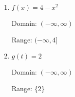 \documentclass{ximera}
\begin{document}
\begin{enumerate}



\item 


$f(x) = 4-x^2$

Domain: $(-\infty, \infty)$ 

Range:  $(-\infty, 4]$

 

 





\item   

$g(t) = 2$

Domain: $(-\infty, \infty)$ 

Range:  $\{2\}$

 

 







\end{enumerate}
\end{document}
